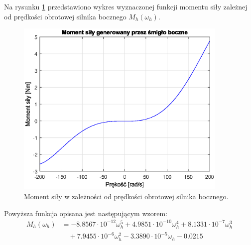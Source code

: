 \documentclass[11pt,a4paper]{article}
\begin{document}
Na rysunku \ref{fig:ident_M_h} przedstawiono wykres wyznaczonej funkcji momentu siły zależnej od prędkości obrotowej silnika bocznego \(M_h(\omega_h)\).

\begin{figure}[H]
	\centering
	\includegraphics[width=4in]{Figures/ident_M_h.eps}
	\caption{Moment siły w zależności od prędkości obrotowej silnika bocznego.}
	\label{fig:ident_M_h}
\end{figure}

Powyższa funkcja opisana jest następującym wzorem:
\begin{equation}
\begin{aligned}
M_h(\omega_h) &= -8.8567\cdot 10^{-12}\omega_h^5+4.9851\cdot 10^{-10}\omega_h^4+8.1331\cdot 10^{-7}\omega_h^3\\ & \quad +7.9455\cdot 10^{-6}\omega_h^2-3.3890\cdot 10^{-5}\omega_h-0.0215
\end{aligned}
\end{equation}
\end{document}
